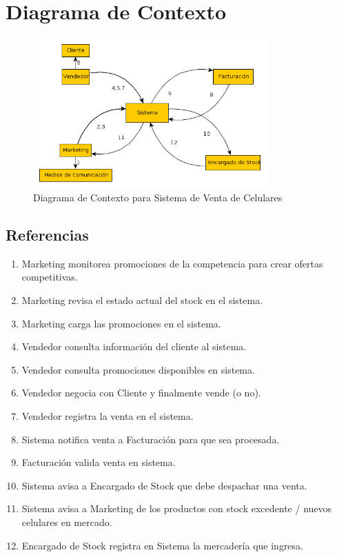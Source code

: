 \section{Diagrama de Contexto}

\begin{figure}[h!]
  	\centering
	\includegraphics[width=0.8\textwidth]{./figs/diagcontext.png}
	\caption{Diagrama de Contexto para Sistema de Venta de Celulares}
\end{figure}

\subsection{Referencias}

\begin{enumerate}

	\item Marketing monitorea promociones de la competencia para crear ofertas competitivas.
	 
	\item Marketing revisa el estado actual del stock en el sistema.
	 
	\item Marketing carga las promociones en el sistema.
	 
	\item Vendedor consulta información del cliente al sistema.
	 
	\item Vendedor consulta promociones disponibles en sistema.
	 
	\item Vendedor negocia con Cliente y finalmente vende (o no).
	 
	\item Vendedor registra la venta en el sistema.
	 
	\item Sistema notifica venta a Facturación para que sea procesada.
	 
	\item Facturación valida venta en sistema.
	 
	\item Sistema avisa a Encargado de Stock que debe despachar una venta.

	\item Sistema avisa a Marketing de los productos con stock excedente / nuevos celulares en mercado.

	\item Encargado de Stock registra en Sistema la mercadería que ingresa.

\end{enumerate}
